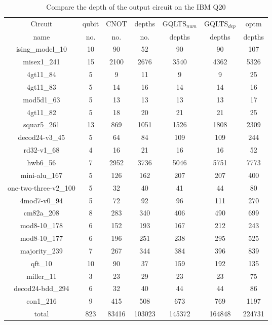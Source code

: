 \documentclass[runningheads]{llncs}
\begin{document}
							\begin{table}[H]
								\label{tab8}
								\begin{center}  
								\begin{tabular}{|c|c|c|c|c|c|c|}
								\hline
								Circuit &  qubit  & CNOT &depths &GQLTS$_{num}$& GQLTS$_{dep}$  & optm 	  	\\
								 name	&   no. 	&	no. & no. & depths&  depths &  depths 	\\
								\hline
								ising\_model\_10 & 10 & 90 & 52 & 90 & 90 & 107 \\
								misex1\_241 & 15 & 2100 & 2676 & 3540 & 4362 & 5326 \\
								4gt11\_84 & 5 & 9 & 11 & 9 & 9 & 25 \\
								4gt11\_83 & 5 & 14 & 16 & 14 & 14 & 16 \\
								mod5d1\_63 & 5 & 13 & 13 & 13 & 13 & 17 \\
								4gt11\_82 & 5 & 18 & 20 & 21 & 21 & 25 \\
								squar5\_261 & 13 & 869 & 1051 & 1526 & 1808 & 2309 \\
								decod24-v3\_45 & 5 & 64 & 84 & 109 & 109 & 244 \\
								rd32-v1\_68 & 4 & 16 & 21 & 16 & 16 & 52 \\
								hwb6\_56 & 7 & 2952 & 3736 & 5046 & 5751 & 7773 \\
								mini-alu\_167 & 5 & 126 & 162 & 207 & 207 & 400 \\
								one-two-three-v2\_100 & 5 & 32 & 40 & 41 & 44 & 80 \\
								4mod7-v0\_94 & 5 & 72 & 92 & 96 & 111 & 270 \\
								cm82a\_208 & 8 & 283 & 340 & 406 & 490 & 699 \\
								mod8-10\_178 & 6 & 152 & 193 & 167 & 212 & 243 \\
								mod8-10\_177 & 6 & 196 & 251 & 238 & 295 & 525 \\
								majority\_239 & 7 & 267 & 344 & 384 & 396 & 839 \\
								qft\_10 & 10 & 90 & 37 & 159 & 192 & 135 \\
								miller\_11 & 3 & 23 & 29 & 23 & 23 & 75 \\
								decod24-bdd\_294 & 6 & 32 & 40 & 44 & 44 & 86 \\
								con1\_216 & 9 & 415 & 508 & 673 & 769 & 1197 \\
								\hline
								total & 823 & 83416 & 103023 & 145372 & 164848 & 224731  \\ 
							\hline
								\end{tabular} 
								\end{center}						
								\caption{Compare the depth of the output circuit on the IBM Q20} 
								\label{tab8}\end{table}
\end{document}
